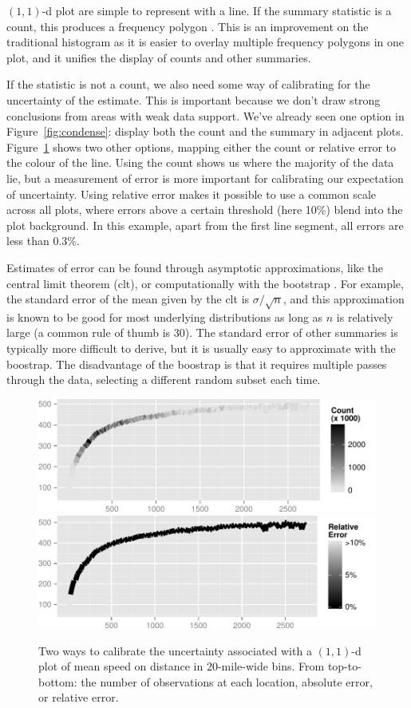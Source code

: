 \documentclass[journal]{vgtc}                %
\begin{document}
$(1,1)$-d plot are simple to represent with a line. If the summary statistic is a count, this produces a frequency polygon \citep{scott:1985a}. This is an improvement on the traditional histogram as it is easier to overlay multiple frequency polygons in one plot, and it unifies the display of counts and other summaries. 

If the statistic is not a count, we also need some way of calibrating for the uncertainty of the estimate. This is important because we don't draw strong conclusions from areas with weak data support. We've already seen one option in Figure~\ref{fig:condense}: display both the count and the summary in adjacent plots. Figure~\ref{fig:1d-error} shows two other options, mapping either the count or relative error to the colour of the line. Using the count shows us where the majority of the data lie, but a measurement of error is more important for calibrating our expectation of uncertainty. Using relative error makes it possible to use a common scale across all plots, where errors above a certain threshold (here 10\%) blend into the plot background. In this example, apart from the first line segment, all errors are less than 0.3\%.

Estimates of error can be found through asymptotic approximations, like the central limit theorem ({\sc clt}), or computationally with the bootstrap \citep{efron:1983}. For example, the standard error of the mean given by the {\sc clt} is $\sigma / \sqrt{n}$, and this approximation is known to be good for most underlying distributions as long as $n$ is relatively large (a common rule of thumb is 30). The standard error of other summaries is typically more difficult to derive, but it is usually easy to approximate with the boostrap. The disadvantage of the boostrap is that it requires multiple passes through the data, selecting a different random subset each time.  

\begin{figure}
  \centering
   \includegraphics[width=0.8\linewidth]{1d-count}
   \includegraphics[width=0.8\linewidth]{1d-relerr}
 \caption{Two ways to calibrate the uncertainty associated with a $(1,1)$-d plot of mean speed on distance in 20-mile-wide bins. From top-to-bottom: the number of observations at each location, absolute error, or relative error.}
 \label{fig:1d-error}
\end{figure}
\end{document}
